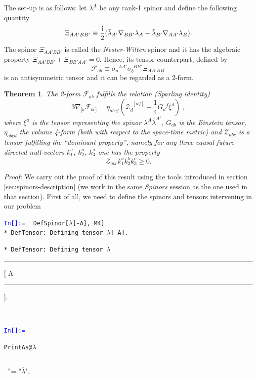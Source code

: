 \documentclass[final,3p,times,twocolumn]{elsarticle}
\newcounter{bla}
\newcommand{\dd}{\;\rule{0.018cm}{.15cm}\!\raisebox{1mm}{\rule{0.08cm}{.02cm}}}
\newcounter{mathex}
\newcommand{\Mathsize}{\scriptsize}
\newcommand{\MathIn}[2]{ {\textcolor{blue}{\tt In[\arabic{#1}]:=} }\ { \tt #2 } \\[1mm] }
\newcommand{\DefTensorMessage}[1]{ {\tt ** DefTensor: Defining tensor #1.} \\ }
\newtheorem{theorem}{Theorem}
\begin{document}
The set-up is as follows: let $\lambda^A$ be any rank-1 spinor and define the
following quantity
%
\begin{equation}
\Xi_{AA'BB'}\equiv\frac{\rm i}{2}(\bar\lambda_{A'}\nabla_{BB'}\lambda_A-\bar\lambda_{B'}\nabla_{AA'}\lambda_B). 
\label{eq:nester-witten}
\end{equation}
%
The spinor $\Xi_{AA'BB'}$ is called the {\em Nester-Witten} spinor and it has
the algebraic property $\Xi_{AA'BB'}+\Xi_{BB'AA'}=0$. Hence, its tensor
counterpart, defined by
%
\begin{equation}
\mathcal{F}_{ab}\equiv \sigma_{a}^{\phantom{a}AA'}\sigma_{b}^{\phantom{b}BB'}\Xi_{AA'BB'} 
\end{equation}
%
is an antisymmetric tensor and it can be regarded as a 2-form.
 
\begin{theorem}
The 2-form $\mathcal{F}_{ab}$ fulfills the relation (Sparling identity)
%
\begin{equation}
3\nabla_{[a}{\mathcal F}_{bc]}= 
\eta_{abcf}\left(\mathcal{Z}_d^{\phantom{d}[df]}- \frac{1}{4} G_{d}{}^{f} \xi^{d}\right)\;, 
\label{eq:sparling-equation}
\end{equation}
%
where $\xi^a$ is the tensor representing the spinor $\lambda^A\bar\lambda^{A'}$,
$G_{ab}$ is the Einstein tensor, $\eta_{abcd}$ the volume 4-form (both with
respect to the space-time metric) and ${\mathcal Z}_{abc}$ is a tensor
fulfilling the ``dominant property'', namely for any three causal
future-directed null vectors $k_1^a$, $k_2^a$, $k_3^a$ one has the property
%
\begin{equation}
{\mathcal Z}_{abc}k_1^ak_2^bk_3^c\geq 0. 
\label{eq:dominant-property}
\end{equation}
\end{theorem}

\noindent
{\em Proof:} We carry out the proof of this result using the tools introduced
in section \ref{sec:spinors-description} (we work in the same {\em Spinors}
session as the one used in that section). First of all, we need to define the
spinors and tensors intervening in our problem

\begin{flushleft}
\Mathsize
{}
\MathIn{mathex}{DefSpinor[$\lambda$[-A], M4]}
\DefTensorMessage{$\lambda$[-A]}
\DefTensorMessage{$\lambda$\dd[-A\dd]}
\end{flushleft}

\begin{flushleft}
\Mathsize
{}
\MathIn{mathex}{PrintAs@$\lambda$\dd\ ${}^{\wedge}$= "$\overline\lambda$";}
\end{flushleft}
\end{document}
